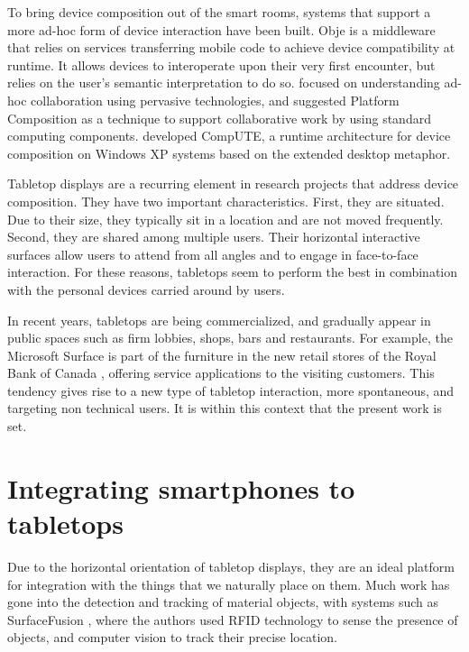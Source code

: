 To bring device composition out of the smart rooms, systems that support a more ad-hoc form of device interaction have been built.
Obje \citep{Edwards:2009:obje} is a middleware that relies on services transferring mobile code to achieve device compatibility at runtime.
It allows devices to interoperate upon their very first encounter, but relies on the user's semantic interpretation to do so.
\cite{Pering:2009:platformcomp} focused on understanding ad-hoc collaboration using pervasive technologies, and suggested Platform Composition as a technique to support collaborative work by using standard computing components.
\cite{Bardram:2010:compute} developed CompUTE, a runtime architecture for device composition on Windows XP systems based on the extended desktop metaphor.

Tabletop displays are a recurring element in research projects that address device composition.
They have two important characteristics.
First, they are situated.
Due to their size, they typically sit in a location and are not moved frequently.
Second, they are shared among multiple users.
Their horizontal interactive surfaces allow users to attend from all angles and to engage in face-to-face interaction.
For these reasons, tabletops seem to perform the best in combination with the personal devices carried around by users.

In recent years, tabletops are being commercialized, and gradually appear in public spaces such as firm lobbies, shops, bars and restaurants.
For example, the Microsoft Surface is part of the furniture in the new retail stores of the Royal Bank of Canada \citep{mscase}, offering service applications to the visiting customers.
This tendency gives rise to a new type of tabletop interaction, more spontaneous, and targeting non technical users.
It is within this context that the present work is set.

\section{Integrating smartphones to tabletops}
\label{sec:rwintegration}

Due to the horizontal orientation of tabletop displays, they are an ideal platform for integration with the things that we naturally place on them.
Much work has gone into the detection and tracking of material objects, with systems such as SurfaceFusion \citep{Olwal:2008:surfacefusion}, where the authors used RFID technology to sense the presence of objects, and computer vision to track their precise location.

